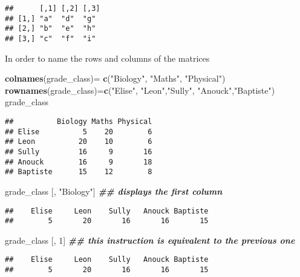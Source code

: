 \documentclass[
]{article}
\newenvironment{Shaded}{\begin{snugshade}}{\end{snugshade}}
\newcommand{\DecValTok}[1]{\textcolor[rgb]{0.00,0.00,0.81}{#1}}
\newcommand{\DocumentationTok}[1]{\textcolor[rgb]{0.56,0.35,0.01}{\textbf{\textit{#1}}}}
\newcommand{\FunctionTok}[1]{\textcolor[rgb]{0.13,0.29,0.53}{\textbf{#1}}}
\newcommand{\NormalTok}[1]{#1}
\newcommand{\OtherTok}[1]{\textcolor[rgb]{0.56,0.35,0.01}{#1}}
\newcommand{\StringTok}[1]{\textcolor[rgb]{0.31,0.60,0.02}{#1}}
\begin{document}
\begin{verbatim}
##      [,1] [,2] [,3]
## [1,] "a"  "d"  "g" 
## [2,] "b"  "e"  "h" 
## [3,] "c"  "f"  "i"
\end{verbatim}

In order to name the rows and columns of the matrices

\begin{Shaded}
\begin{Highlighting}[]
\FunctionTok{colnames}\NormalTok{(grade\_class)}\OtherTok{=} \FunctionTok{c}\NormalTok{(}\StringTok{"Biology"}\NormalTok{, }\StringTok{"Maths"}\NormalTok{, }\StringTok{"Physical"}\NormalTok{)}
\FunctionTok{rownames}\NormalTok{(grade\_class)}\OtherTok{=}\FunctionTok{c}\NormalTok{(}\StringTok{"Elise"}\NormalTok{, }\StringTok{"Leon"}\NormalTok{,}\StringTok{"Sully"}\NormalTok{, }\StringTok{"Anouck"}\NormalTok{,}\StringTok{"Baptiste"}\NormalTok{)}
\NormalTok{grade\_class}
\end{Highlighting}
\end{Shaded}

\begin{verbatim}
##          Biology Maths Physical
## Elise          5    20        6
## Leon          20    10        6
## Sully         16     9       16
## Anouck        16     9       18
## Baptiste      15    12        8
\end{verbatim}

\begin{Shaded}
\begin{Highlighting}[]
\NormalTok{grade\_class [, }\StringTok{"Biology"}\NormalTok{] }\DocumentationTok{\#\# displays the first column}
\end{Highlighting}
\end{Shaded}

\begin{verbatim}
##    Elise     Leon    Sully   Anouck Baptiste 
##        5       20       16       16       15
\end{verbatim}

\begin{Shaded}
\begin{Highlighting}[]
\NormalTok{grade\_class [, }\DecValTok{1}\NormalTok{] }\DocumentationTok{\#\# this instruction is equivalent to the previous one}
\end{Highlighting}
\end{Shaded}

\begin{verbatim}
##    Elise     Leon    Sully   Anouck Baptiste 
##        5       20       16       16       15
\end{verbatim}
\end{document}
